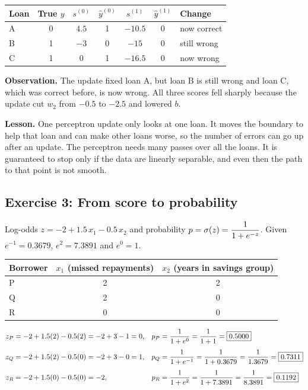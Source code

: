 \begin{table}[H]\centering\small
\begin{tabular}{lcccccl}\toprule
Loan & True $y$ & $s^{(0)}$ & $\hat y^{(0)}$ & $s^{(1)}$ & $\hat y^{(1)}$ & Change\\\midrule
A & 0 & $4.5$ & 1 & $-10.5$ & 0 & now correct\\
B & 1 & $-3$  & 0 & $-15$   & 0 & still wrong\\
C & 1 & $0$   & 1 & $-16.5$ & 0 & now wrong\\\bottomrule
\end{tabular}\end{table}

\textbf{Observation.} The update fixed loan A, but loan B is still wrong and loan C, which
was correct before, is now wrong. All three scores fell sharply because the update cut
$w_2$ from $-0.5$ to $-2.5$ and lowered $b$.

\textbf{Lesson.} One perceptron update only looks at one loan. It moves the boundary to help
that loan and can make other loans worse, so the number of errors can go up after an update.
The perceptron needs many passes over all the loans. It is guaranteed to stop only if the
data are linearly separable, and even then the path to that point is not smooth.

\subsection{Exercise 3: From score to probability}
Log-odds $z = -2 + 1.5\,x_1 - 0.5\,x_2$ and probability $p = \sigma(z) = \dfrac{1}{1+e^{-z}}$.
Given $e^{-1}=0.3679$, $e^{2}=7.3891$ and $e^{0}=1$.

\begin{table}[H]\centering\small
\begin{tabular}{lcc}\toprule
Borrower & $x_1$ (missed repayments) & $x_2$ (years in savings group)\\\midrule
P & 2 & 2\\ Q & 2 & 0\\ R & 0 & 0\\\bottomrule
\end{tabular}\end{table}

\begin{align*}
z_P &= -2 + 1.5(2) - 0.5(2) = -2 + 3 - 1 = 0,
  & p_P &= \frac{1}{1+e^{0}} = \frac{1}{1+1} = \boxed{0.5000}\\[4pt]
z_Q &= -2 + 1.5(2) - 0.5(0) = -2 + 3 - 0 = 1,
  & p_Q &= \frac{1}{1+e^{-1}} = \frac{1}{1+0.3679} = \frac{1}{1.3679} = \boxed{0.7311}\\[4pt]
z_R &= -2 + 1.5(0) - 0.5(0) = -2,
  & p_R &= \frac{1}{1+e^{2}} = \frac{1}{1+7.3891} = \frac{1}{8.3891} = \boxed{0.1192}
\end{align*}

